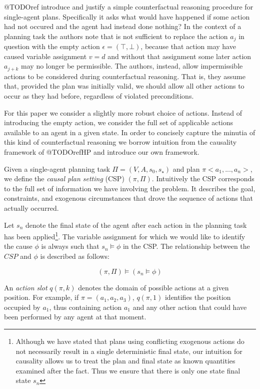 \documentclass{article}
\theoremstyle{plain}
\theoremstyle{definition}
\begin{document}
@TODOref introduce and justify a simple counterfactual reasoning procedure for single-agent plans. Specifically it asks what would have happened if some action had not occured and the agent had instead done nothing? In the context of a planning task the authors note that is not sufficient to replace the action $a_j$ in question with the empty action $\epsilon=(\top, \bot)$, because that action may have caused variable assignment $v=d$ and without that assignment some later action $a_{j+k}$ may no longer be permissible. The authors, instead, allow impermissible actions to be considered during counterfactual reasoning. That is, they assume that, provided the plan was initially valid, we should allow all other actions to occur as they had before, regardless of violated preconditions.

For this paper we consider a slightly more robust choice of actions. Instead of introducing the empty action, we consider the full set of applicable actions available to an agent in a given state. In order to concisely capture the minutia of this kind of counterfactual reasoning we borrow intuition from the causality framework of @TODOrefHP and introduce our own framework.

Given a single-agent planning task $\Pi=(V, A, s_0, s_\star)$ and plan $\pi<a_1,...,a_n>$, we define the \textit{causal plan setting} (CSP) $(\pi,\Pi)$. Intuitively the CSP corresponds to the full set of information we have involving the problem. It describes the goal, constraints, and exogenous circumstances that drove the sequence of actions that actually occurred.

Let $s_n$ denote the final state of the agent after each action in the planning task has been applied\footnote{Although we have stated that plans using conflicting exogenous actions do not necessarily result in a single deterministic final state, our intuition for causality allows us to treat the plan and final state as known quantities examined after the fact. Thus we ensure that there is only one state final state $s_n$}. The variable assignment for which we would like to identify the cause $\phi$ is always such that $s_n \models \phi$ in the CSP. The relationship between the $CSP$ and $\phi$ is described as follows:

\[
(\pi, \Pi) \models (s_n \models \phi)
\]

An \textit{action slot} $q(\pi,k)$ denotes the domain of possible actions at a given position. For example, if $\pi=(a_1,a_2,a_3)$, $q(\pi,1)$ identifies the position occupied by $a_1$, thus containing action $a_1$ and any other action that could have been performed by any agent at that moment.
\end{document}
